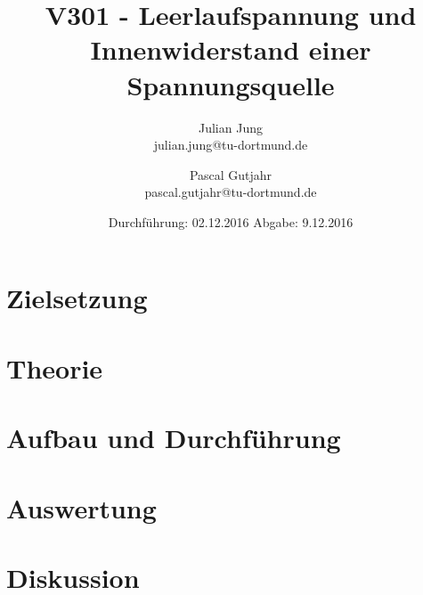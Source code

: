 

\title{V301 - Leerlaufspannung und Innenwiderstand einer Spannungsquelle}
\author{Julian Jung \\ julian.jung@tu-dortmund.de
  \and Pascal Gutjahr \\ pascal.gutjahr@tu-dortmund.de}
  \date{Durchführung: 02.12.2016
  \hspace{3em}
  Abgabe: 9.12.2016}
  
\maketitle
\newpage
\tableofcontents
\newpage
\section{Zielsetzung}
\section{Theorie}
% 
\section{Aufbau und Durchführung}
% 
\section{Auswertung}
% 
\section{Diskussion}
% 
\printbibliography

